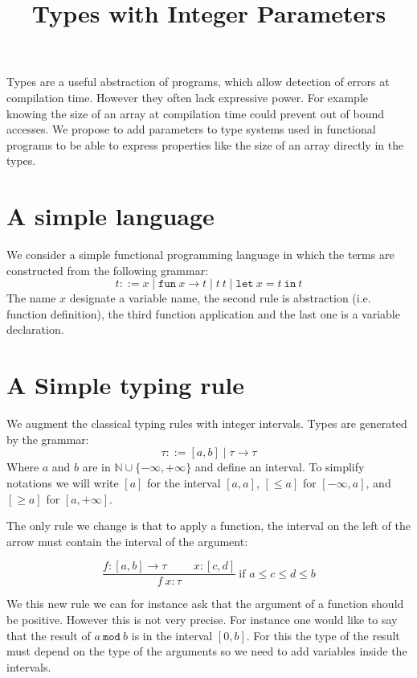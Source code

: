 \documentclass{article}
\title{Types with Integer Parameters}
\date{}
\begin{document}
\maketitle{}

Types are a useful abstraction of programs, which allow detection of errors at compilation time.
However they often lack expressive power.
For example knowing the size of an array at compilation time could prevent out of bound accesses.
We propose to add parameters to type systems used in functional programs to be able to express properties like the size of an array directly in the types.

\section{A simple language}
We consider a simple functional programming language in which the terms are constructed from the following grammar:
\[ t ::= x \mid \texttt{fun}\ x \rightarrow t \mid t~t \mid \texttt{let}\ x = t\ \texttt{in}\ t \]
The name $x$ designate a variable name, the second rule is abstraction (i.e. function definition), the third function application and the last one is a variable declaration.


\section{A Simple typing rule}
We augment the classical typing rules with integer intervals.
Types are generated by the grammar:
\[ \tau ::= [a,b] \mid \tau \rightarrow \tau \]
Where $a$ and $b$ are in $\mathbb{N} \cup \{ -\infty , +\infty \}$ and define an interval.
To simplify notations we will write $[a]$ for the interval $[a,a]$, $[\le a]$ for $[-\infty,a]$, and $[\ge a]$ for $[a, +\infty]$.


The only rule we change is that to apply a function, the interval on the left of the arrow must contain the interval of the argument:

\[ \frac{f : [a,b] \rightarrow \tau \hspace{1cm} x : [c,d]}{ f~x : \tau} ~\text{if } a \le c \le d \le b\]

We this new rule we can for instance ask that the argument of a function should be positive.
However this is not very precise.
For instance one would like to say that the result of $a~\texttt{mod}~b$ is in the interval $[0,b]$.
For this the type of the result must depend on the type of the arguments so we need to add variables inside the intervals.
\end{document}
